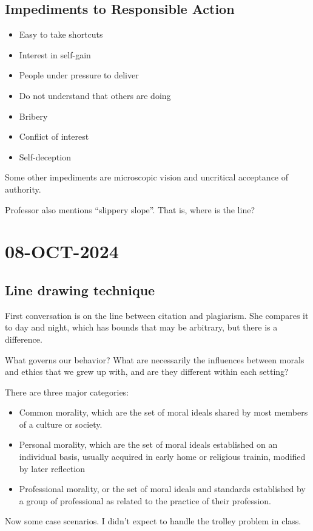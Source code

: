 \documentclass[10pt, oneside]{article}
\begin{document}
\subsection{Impediments to Responsible Action}
\begin{itemize}
    \item Easy to take shortcuts
    \item Interest in self-gain
    \item People under pressure to deliver
    \item Do not understand that others are doing 
    \item Bribery
    \item Conflict of interest
    \item Self-deception
\end{itemize}
Some other impediments are microscopic vision and uncritical acceptance of authority. 

Professor also mentions ``slippery slope''. That is, where is the line?

\section{08-OCT-2024}
\subsection{Line drawing technique}

First conversation is on the line between citation and plagiarism. She compares it to day and night, which has bounds that may be arbitrary, but there is a difference. 

What governs our behavior? What are necessarily the influences between morals and ethics that we grew up with, and are they different within each setting?

There are three major categories:
\begin{itemize}
    \item Common morality, which are the set of moral ideals shared by most members of a culture or society.
    \item Personal morality, which are the set of moral ideals established on an individual basis, usually acquired in early home or religious trainin, modified by later reflection
    \item Professional morality, or the set of moral ideals and standards established by a group of professional as related to the practice of their profession.
\end{itemize}
Now some case scenarios. I didn't expect to handle the trolley problem in class.
\end{document}
